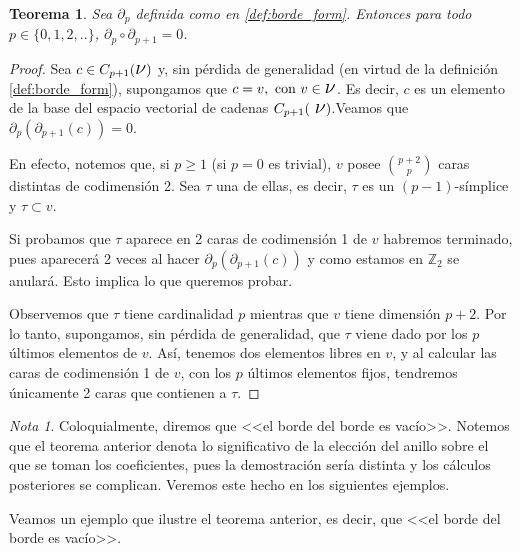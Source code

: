 \documentclass[12pt, a4paper, twoside]{book}
\numberwithin{equation}{section}
\newtheorem{theorem}{Teorema}
\theoremstyle{definition}
\theoremstyle{remark}
\newtheorem*{remark}{Nota}
\theoremstyle{plain}
\begin{document}
	\begin{theorem}
		Sea $\partial_{p}$ definida como en \ref{def:borde_form}. 
		Entonces para todo $p \in \{0,1,2,..\}$, $\partial_{p}\circ 
		\partial_{p+1}=0$.
	\end{theorem}
	\begin{proof}
		Sea $c \in C_{p+1}(\text{{\Large $\nu$}})$ y, sin pérdida
		de generalidad (en virtud de la definición 
		\ref{def:borde_form}), supongamos que $c=v,\text{ con }v\in 
		\text{{\Large $\nu$}}$. Es decir, $c$ es un elemento de la 
		base del espacio vectorial de cadenas $C_{p+1}(\text{
		{\Large $\nu$}})$.Veamos que $\partial_{p}(
		\partial_{p+1}(c))=0$.

		En efecto, notemos que, si $p\geq1$ (si $p=0$ es trivial), $v$ 
		posee $\binom{p+2}{p}$ 
		caras distintas de codimensión 2. Sea $\tau$ una de ellas, es 
		decir, $\tau$ es un $(p-1)$-símplice y $\tau \subset v$.

		Si probamos que $\tau$ aparece en 2 caras de codimensión 1 de 
		$v$ habremos terminado, pues aparecerá 2 veces al 
		hacer $\partial_{p}(\partial_{p+1}(c))$ y como estamos en 
		$\mathbb{Z}_{2}$ se anulará. Esto implica lo que queremos
		probar.

		Observemos que $\tau$ tiene cardinalidad $p$ mientras que $v$ 
		tiene dimensión $p+2$. Por lo tanto, supongamos, sin pérdida 
		de generalidad, que $\tau$ viene dado por los $p$ últimos 
		elementos de $v$. Así, tenemos dos elementos libres en $v$, y 
		al calcular las caras de codimensión 1 de $v$, con los $p$ 
		últimos elementos fijos, tendremos únicamente 2 caras que 
		contienen a $\tau$.  	
	\end{proof}
	
	\begin{remark}
		Coloquialmente, diremos que <<el borde del borde es vacío>>. 
		Notemos que el teorema anterior denota lo significativo de la 
		elección del anillo sobre el que se toman los coeficientes, 
		pues la demostración sería distinta y los cálculos posteriores 
		se complican. Veremos este hecho en los siguientes ejemplos.
	\end{remark}

	Veamos un ejemplo que ilustre el teorema anterior, es decir, que 
	<<el borde del borde es vacío>>.
\end{document}
